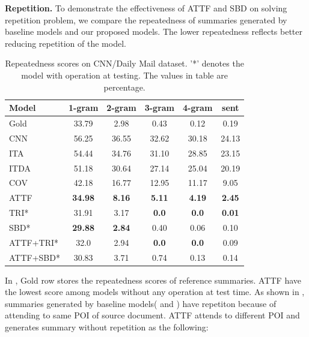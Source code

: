 \textbf{Repetition.}
To demonstrate the effectiveness of ATTF and SBD on solving repetition
problem, we compare the repeatedness of summaries generated by
baseline models and our proposed models.
The lower repeatedness reflects better reducing repetition of the model.

\begin{table}[th]
	\centering
	\scriptsize
	\begin{tabular}{|l|c|c|c|c|c|}
		\hline
		Model & 1-gram  & 2-gram & 3-gram & 4-gram & sent \\
		\hline
		Gold & 33.79 & 2.98 & 0.43 & 0.12 & 0.19 \\
		\hline
		CNN &  56.25 & 36.55 & 32.62 & 30.18 & 24.13 \\
		ITA & 54.44 & 34.76 &31.10 & 28.85 & 23.15  \\
		ITDA & 51.18 & 30.64 & 27.14 & 25.04 & 20.19 \\
		COV & 42.18 & 16.77 & 12.95 & 11.17 & 9.05 \\
		ATTF & \bf 34.98 & \bf 8.16 & \bf 5.11 & \bf 4.19 & \bf 2.45 \\
        \hline
		TRI* & 31.91 & 3.17 & \bf 0.0 & \bf 0.0 & \bf 0.01 \\
		SBD* & \bf 29.88 & \bf 2.84 & 0.40 & 0.06 & 0.10 \\
		ATTF+TRI* & 32.0 & 2.94 & \bf 0.0 & \bf 0.0 & 0.09\\
		ATTF+SBD* & 30.83 & 3.71 & 0.74 & 0.13 & 0.14\\
		\hline
	\end{tabular}
	\caption{Repeatedness scores on CNN/Daily Mail dataset. '*' denotes the model with operation
	at testing. The values in table are percentage.}
	\label{tab:eval_repe}
\end{table}

In , Gold row stores the repeatedness scores of
reference summaries. ATTF have the lowest
score among models without any operation at test time. 
As shown in , summaries generated by baseline models( and )
have repetiton because of attending to same POI of source document. 
ATTF attends to different POI and generates summary 
without repetition as the following:


